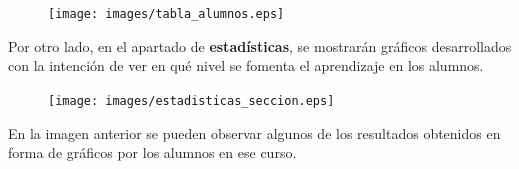 \begin{figure}[!th]
\begin{center}
\texttt{[image: images/tabla\_alumnos.eps]}
\label{fig:21}
\end{center}
\end{figure}

Por otro lado, en el apartado de \textbf{estadísticas}, se mostrarán gráficos desarrollados con la intención de ver en qué nivel se fomenta el aprendizaje en los alumnos.

\begin{figure}[!th]
\begin{center}
\texttt{[image: images/estadisticas\_seccion.eps]}
\label{fig:22}
\end{center}
\end{figure}

En la imagen anterior se pueden observar algunos de los resultados obtenidos en forma de gráficos por los alumnos en ese curso.